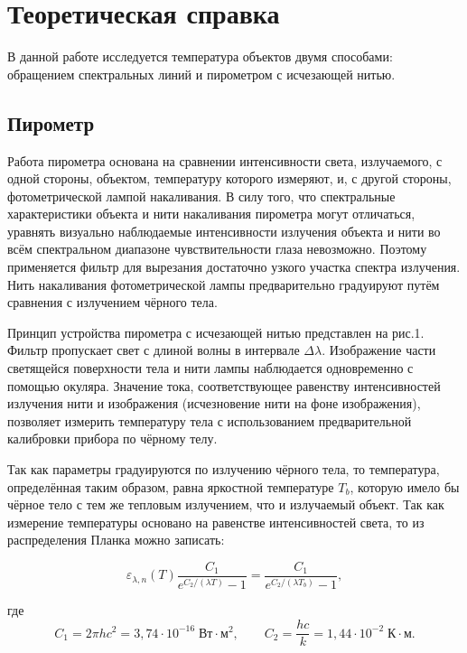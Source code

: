 \documentclass[12pt,a4paper]{article}
\begin{document}
\section{ Теоретическая справка}
В данной работе исследуется температура объектов двумя способами: обращением спектральных линий и пирометром с исчезающей нитью.

\subsection{ Пирометр}
Работа пирометра основана на сравнении интенсивности света, излучаемого, с одной стороны, объектом, температуру которого измеряют, и, с другой стороны, фотометрической лампой накаливания.
В силу того, что спектральные характеристики объекта и нити накаливания пирометра могут отличаться, уравнять визуально наблюдаемые интенсивности излучения объекта и нити во всём спектральном диапазоне чувствительности глаза невозможно.
Поэтому применяется фильтр для вырезания достаточно узкого участка спектра излучения.
Нить накаливания фотометрической лампы предварительно градуируют путём сравнения с излучением чёрного тела.

Принцип устройства пирометра с исчезающей нитью представлен на рис.1. Фильтр пропускает свет с длиной волны в интервале \(\Delta\lambda\).
Изображение части светящейся поверхности тела и нити лампы наблюдается одновременно с помощью окуляра.
Значение тока, соответствующее равенству интенсивностей излучения нити и изображения (исчезновение нити на фоне изображения), позволяет измерить температуру тела с использованием предварительной калибровки прибора по чёрному телу.

Так как параметры градуируются по излучению чёрного тела, то температура, определённая таким образом, равна яркостной температуре \(T_b\), которую имело бы чёрное тело с тем же тепловым излучением, что и излучаемый объект.
Так как измерение температуры основано на равенстве интенсивностей света, то из распределения Планка можно записать:

\begin{equation}
\varepsilon_{\lambda,n}(T) \frac{C_1}{e^{C_2/(\lambda T)} - 1} 
= \frac{C_1}{e^{C_2/(\lambda T_b)} - 1},
\end{equation}

где 
\begin{equation}
C_1 = 2\pi hc^2 = 3{,}74 \cdot 10^{-16} \; \text{Вт} \cdot \text{м}^2,
\qquad 
C_2 = \frac{hc}{k} = 1{,}44 \cdot 10^{-2} \; \text{К} \cdot \text{м}.
\end{equation}
\end{document}
